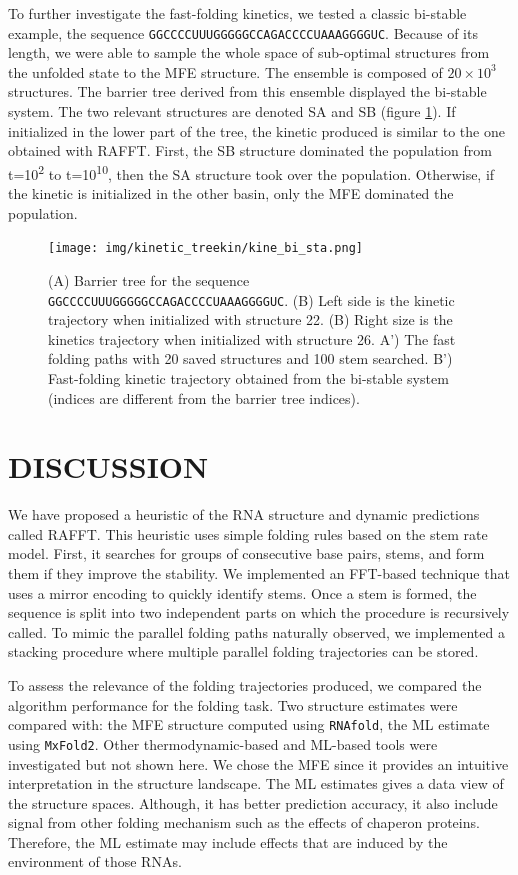 \documentclass[a4paper,12pt]{article}
\begin{document}
To further investigate the fast-folding kinetics, we tested a classic bi-stable
example, the sequence \texttt{GGCCCCUUUGGGGGCCAGACCCCUAAAGGGGUC}. Because of its
length, we were able to sample the whole space of sub-optimal structures from
the unfolded state to the MFE structure. The ensemble is composed of \(20 \times
10^3\) structures. The barrier tree derived from this ensemble displayed the
bi-stable system. The two relevant structures are denoted SA and SB (figure
\ref{class_examp}). If initialized in the lower part of the tree, the kinetic
produced is similar to the one obtained with RAFFT. First, the SB structure
dominated the population from t=10\textsuperscript{2} to t=10\textsuperscript{10}, then the SA structure took over
the population. Otherwise, if the kinetic is initialized in the other basin,
only the MFE dominated the population.

\begin{figure}[h!]
\centering
\texttt{[image: img/kinetic\_treekin/kine\_bi\_sta.png]}
\caption{\label{class_examp}(A) Barrier tree for the sequence \texttt{GGCCCCUUUGGGGGCCAGACCCCUAAAGGGGUC}. (B) Left side is the kinetic trajectory when initialized with structure 22. (B) Right size is the kinetics trajectory when initialized with structure 26. A') The fast folding paths with 20 saved structures and 100 stem searched. B') Fast-folding kinetic trajectory obtained from the bi-stable system (indices are different from the barrier tree indices).}
\end{figure}

\section*{DISCUSSION}
\label{sec:orgedf3722}
We have proposed a heuristic of the RNA structure and dynamic predictions called
RAFFT. This heuristic uses simple folding rules based on the stem rate model.
First, it searches for groups of consecutive base pairs, stems, and form them if
they improve the stability. We implemented an FFT-based technique that uses a
mirror encoding to quickly identify stems. Once a stem is formed, the sequence
is split into two independent parts on which the procedure is recursively
called. To mimic the parallel folding paths naturally observed, we implemented a
stacking procedure where multiple parallel folding trajectories can be stored.

To assess the relevance of the folding trajectories produced, we compared the
algorithm performance for the folding task. Two structure estimates were
compared with: the MFE structure computed using \texttt{RNAfold}, the ML estimate using
\texttt{MxFold2}. Other thermodynamic-based and ML-based tools were investigated but
not shown here. We chose the MFE since it provides an intuitive interpretation
in the structure landscape. The ML estimates gives a data view of the structure
spaces. Although, it has better prediction accuracy, it also include signal from
other folding mechanism such as the effects of chaperon proteins. Therefore, the
ML estimate may include effects that are induced by the environment of those
RNAs.
\end{document}
